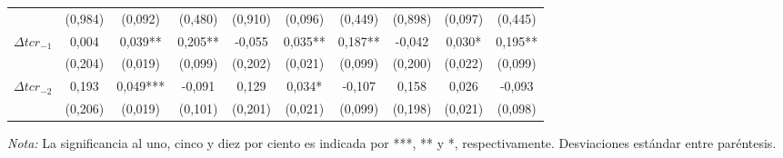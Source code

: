 \documentclass[12pt,letterpaper]{article}
\begin{document}
\begin{table}
\begin{center}
{\begin{tabular}{lccccccccc}
							& (0,984)		& (0,092) 			& (0,480)			& (0,910)		& (0,096) 			& (0,449)			& (0,898)		& (0,097) 			& (0,445)			\\
$\Delta tcr_{-1}$	& 0,004		& 0,039**			& 0,205**			& -0,055		& 0,035**			& 0,187**			& -0,042		& 0,030*			& 0,195**			\\
							& (0,204)		& (0,019)			& (0,099)			& (0,202)		& (0,021)			& (0,099)			& (0,200)		& (0,022)			& (0,099)			\\
$\Delta tcr_{-2}$	& 0,193			& 0,049***		&-0,091			& 0,129			& 0,034*			&-0,107			& 0,158			& 0,026			&-0,093			\\
							& (0,206)		& (0,019)			& (0,101)			& (0,201)		& (0,021)			& (0,099)			& (0,198)		& (0,021)			& (0,098)			\\
\hline									
\hline
\end{tabular}%
}
\end{center}
\begin{scriptsize}
\emph{Nota:} La significancia al uno, cinco y diez por ciento es indicada por ***, ** y *, respectivamente. Desviaciones estándar entre paréntesis.
\end{scriptsize}								
\label{cointx}	
\end{table}	
\end{document}
